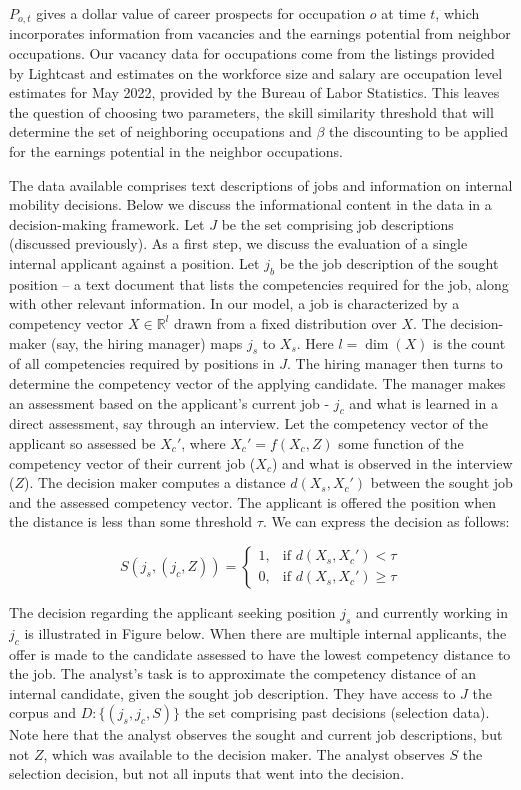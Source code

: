 \documentclass{article}
\begin{document}
$P_{o,t}$ gives a dollar value of career prospects for occupation $o$ at time $t$, which incorporates information from vacancies and the earnings potential from neighbor occupations. Our vacancy data for occupations come from the listings provided by Lightcast and estimates on the workforce size and salary are occupation level estimates for May 2022, provided by the Bureau of Labor Statistics. This leaves the question of choosing two parameters, the skill similarity threshold that will determine the set of neighboring occupations and $\beta$ the discounting to be applied for the earnings potential in the neighbor occupations. 




The data available comprises text descriptions of jobs and information on internal mobility decisions. Below we discuss the informational content in the data in a decision-making framework. Let $J$ be the set comprising job descriptions (discussed previously). As a first step, we discuss the evaluation of a single internal applicant against a position. Let $j_b$ be the job description of the sought position -- a text document that lists the competencies required for the job, along with other relevant information. In our model, a job is characterized by a competency vector $X \in \mathbb{R}^l$ drawn from a fixed distribution over $X$. The decision-maker (say, the hiring manager) maps $j_s$ to $X_s$. Here $l = \dim(X)$ is the count of all competencies required by positions in $J$. The hiring manager then turns to determine the competency vector of the applying candidate. The manager makes an assessment based on the applicant's current job - $j_c$ and what is learned in a direct assessment, say through an interview. Let the competency vector of the applicant so assessed be $X_c'$, where $X_c' = f(X_c, Z)$ some function of the competency vector of their current job ($X_c$) and what is observed in the interview ($Z$). The decision maker computes a distance $d(X_s, X_c')$ between the sought job and the assessed competency vector. The applicant is offered the position when the distance is less than some threshold $\tau$. We can express the decision as follows:

\[
S(j_s, (j_c, Z)) = 
\begin{cases} 
1, & \text{if } d(X_s, X_c') < \tau \\
0, & \text{if } d(X_s, X_c') \geq \tau
\end{cases}
\]

The decision regarding the applicant seeking position $j_s$ and currently working in $j_c$ is illustrated in Figure below. When there are multiple internal applicants, the offer is made to the candidate assessed to have the lowest competency distance to the job. The analyst's task is to approximate the competency distance of an internal candidate, given the sought job description. They have access to $J$ the corpus and $D: \{(j_s, j_c, S)\}$ the set comprising past decisions (selection data). Note here that the analyst observes the sought and current job descriptions, but not $Z$, which was available to the decision maker. The analyst observes $S$ the selection decision, but not all inputs that went into the decision.
\end{document}
